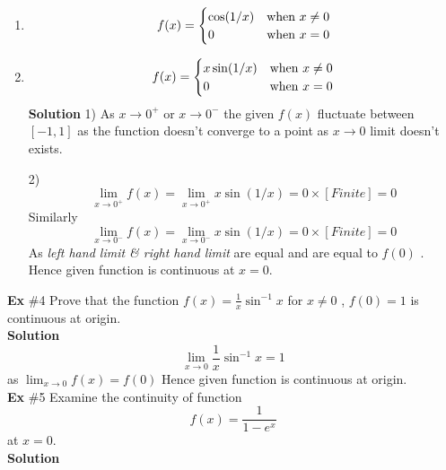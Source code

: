 \documentclass[10pt,a4paper]{article}
\begin{document}
\begin{enumerate}
\item \begin{equation*}
f(x)= \begin{cases} 
\cos(1/x)& $when $ x\neq 0 \\
0 & $when $ x=0
\end{cases}
\end{equation*}
\item \begin{equation*}
f(x)=\begin{cases}
x\sin(1/x) & $when $ x\neq 0 \\
0 & $when $ x = 0
\end{cases}
\end{equation*}
\textbf{Solution } 1) As $x \to 0^+$ or $x \to 0^-$ the given $f(x)$ fluctuate between $[-1,1]$ as the function doesn't converge to a point as $x \to 0$ limit doesn't exists. \par 
2) $$ \lim_{x \to 0^+} f(x) = \lim_{x \to 0^+} x\sin(1/x) = 0\times[Finite] = 0$$
Similarly $$ \lim_{x \to 0^-} f(x) = \lim_{x \to 0^-} x\sin(1/x) = 0\times[Finite] = 0$$ As \emph{left hand limit \& right hand limit } are equal and are equal to $f(0)$ . Hence given function is continuous at $x=0$.
\end{enumerate} 
\textbf{Ex }\#4 Prove that the function $f(x)=\frac{1}{x}\sin^{-1}x$ for $x\neq 0$ , $f(0)=1$ is continuous at origin. \\
\textbf{Solution } $$ \lim_{x \to 0}\frac{1}{x} \sin^{-1} x=1$$ as $\lim_{x \to 0}f(x) = f(0)$ Hence given function is continuous at origin.
\\ \textbf{Ex }\#5 Examine the continuity of function $$f(x)=\frac{1}{1-e^x}$$ at $x=0$.\\
\textbf{Solution }
\end{document}

